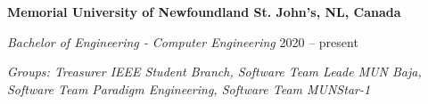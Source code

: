 \textbf{Memorial University of Newfoundland \hfill St. John's, NL, Canada} \par
\textit{Bachelor of Engineering - Computer Engineering} \hfill 2020 -- present\par
\textit{Groups: Treasurer IEEE Student Branch, Software Team Leade MUN Baja, Software Team Paradigm Engineering, Software Team MUNStar-1}